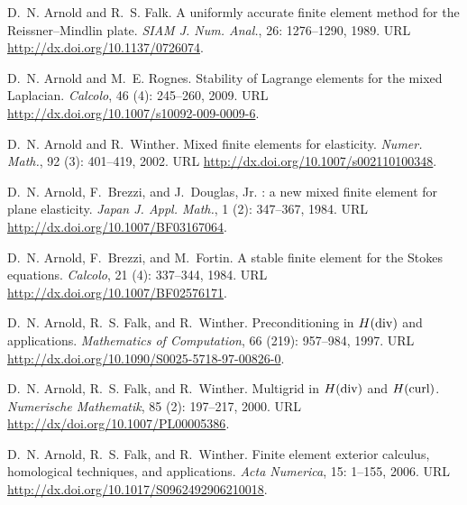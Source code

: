 \begin{thebibliography}{467}
D.~N. Arnold and R.~S. Falk.
\newblock A uniformly accurate finite element method for the
  {R}eissner--{M}indlin plate.
\newblock \emph{SIAM J. Num. Anal.}, 26: 1276--1290, 1989.
\newblock URL \url{http://dx.doi.org/10.1137/0726074}.

D.~N. Arnold and M.~E. Rognes.
\newblock Stability of {L}agrange elements for the mixed {L}aplacian.
\newblock \emph{Calcolo}, 46 (4): 245--260, 2009.
\newblock URL \url{http://dx.doi.org/10.1007/s10092-009-0009-6}.

D.~N. Arnold and R.~Winther.
\newblock Mixed finite elements for elasticity.
\newblock \emph{Numer. Math.}, 92 (3): 401--419, 2002.
\newblock URL \url{http://dx.doi.org/10.1007/s002110100348}.

D.~N. Arnold, F.~Brezzi, and J.~Douglas, Jr.
: a new mixed finite element for plane elasticity.
\newblock \emph{Japan J. Appl. Math.}, 1 (2): 347--367,
  1984{}.
\newblock URL \url{http://dx.doi.org/10.1007/BF03167064}.

D.~N. Arnold, F.~Brezzi, and M.~Fortin.
\newblock A stable finite element for the {S}tokes equations.
\newblock \emph{Calcolo}, 21 (4): 337--344,
  1984{}.
\newblock URL \url{http://dx.doi.org/10.1007/BF02576171}.

D.~N. Arnold, R.~S. Falk, and R.~Winther.
\newblock Preconditioning in {$H({\rm div})$} and applications.
\newblock \emph{Mathematics of Computation}, 66 (219):
  957--984, 1997.
\newblock URL \url{http://dx.doi.org/10.1090/S0025-5718-97-00826-0}.

D.~N. Arnold, R.~S. Falk, and R.~Winther.
\newblock Multigrid in {$H({\rm div})$} and {$H(\rm curl)$}.
\newblock \emph{Numerische Mathematik}, 85 (2): 197--217,
  2000.
\newblock URL \url{http://dx/doi.org/10.1007/PL00005386}.

D.~N. Arnold, R.~S. Falk, and R.~Winther.
\newblock Finite element exterior calculus, homological techniques, and
  applications.
\newblock \emph{Acta Numerica}, 15: 1--155, 2006{}.
\newblock URL \url{http://dx.doi.org/10.1017/S0962492906210018}.


\end{thebibliography}
